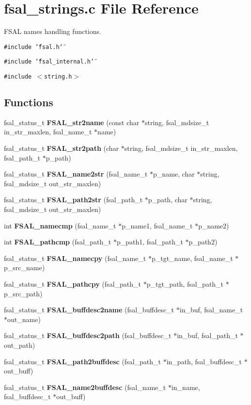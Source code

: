 \section{fsal\_\-strings.c File Reference}
\label{fsal__strings_8c}
FSAL names handling functions. 

{\tt \#include \char`\"{}fsal.h\char`\"{}}\par
{\tt \#include \char`\"{}fsal\_\-internal.h\char`\"{}}\par
{\tt \#include $<$string.h$>$}\par
\subsection*{Functions}
\begin{CompactItemize}
\item 
fsal\_\-status\_\-t {\bf FSAL\_\-str2name} (const char $\ast$string, fsal\_\-mdsize\_\-t in\_\-str\_\-maxlen, fsal\_\-name\_\-t $\ast$name)
\item 
fsal\_\-status\_\-t {\bf FSAL\_\-str2path} (char $\ast$string, fsal\_\-mdsize\_\-t in\_\-str\_\-maxlen, fsal\_\-path\_\-t $\ast$p\_\-path)
\item 
fsal\_\-status\_\-t {\bf FSAL\_\-name2str} (fsal\_\-name\_\-t $\ast$p\_\-name, char $\ast$string, fsal\_\-mdsize\_\-t out\_\-str\_\-maxlen)
\item 
fsal\_\-status\_\-t {\bf FSAL\_\-path2str} (fsal\_\-path\_\-t $\ast$p\_\-path, char $\ast$string, fsal\_\-mdsize\_\-t out\_\-str\_\-maxlen)
\item 
int {\bf FSAL\_\-namecmp} (fsal\_\-name\_\-t $\ast$p\_\-name1, fsal\_\-name\_\-t $\ast$p\_\-name2)
\item 
int {\bf FSAL\_\-pathcmp} (fsal\_\-path\_\-t $\ast$p\_\-path1, fsal\_\-path\_\-t $\ast$p\_\-path2)
\item 
fsal\_\-status\_\-t {\bf FSAL\_\-namecpy} (fsal\_\-name\_\-t $\ast$p\_\-tgt\_\-name, fsal\_\-name\_\-t $\ast$p\_\-src\_\-name)
\item 
fsal\_\-status\_\-t {\bf FSAL\_\-pathcpy} (fsal\_\-path\_\-t $\ast$p\_\-tgt\_\-path, fsal\_\-path\_\-t $\ast$p\_\-src\_\-path)
\item 
fsal\_\-status\_\-t {\bf FSAL\_\-buffdesc2name} (fsal\_\-buffdesc\_\-t $\ast$in\_\-buf, fsal\_\-name\_\-t $\ast$out\_\-name)
\item 
fsal\_\-status\_\-t {\bf FSAL\_\-buffdesc2path} (fsal\_\-buffdesc\_\-t $\ast$in\_\-buf, fsal\_\-path\_\-t $\ast$out\_\-path)
\item 
fsal\_\-status\_\-t {\bf FSAL\_\-path2buffdesc} (fsal\_\-path\_\-t $\ast$in\_\-path, fsal\_\-buffdesc\_\-t $\ast$out\_\-buff)
\item 
fsal\_\-status\_\-t {\bf FSAL\_\-name2buffdesc} (fsal\_\-name\_\-t $\ast$in\_\-name, fsal\_\-buffdesc\_\-t $\ast$out\_\-buff)
\end{CompactItemize}



